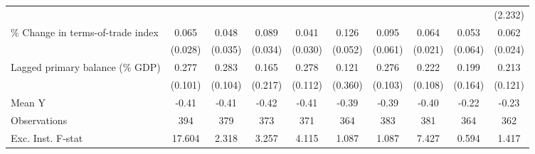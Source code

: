 {\begin{tabular}{l*{9}{c}}
                    &                     &                     &                     &                     &                     &                     &                     &                     &     (2.232)         \\
\addlinespace
\% Change in terms-of-trade index&       0.065\sym{**} &       0.048         &       0.089\sym{***}&       0.041         &       0.126\sym{**} &       0.095         &       0.064\sym{***}&       0.053         &       0.062\sym{***}\\
                    &     (0.028)         &     (0.035)         &     (0.034)         &     (0.030)         &     (0.052)         &     (0.061)         &     (0.021)         &     (0.064)         &     (0.024)         \\
\addlinespace
Lagged primary balance (\% GDP)&       0.277\sym{***}&       0.283\sym{***}&       0.165         &       0.278\sym{**} &       0.121         &       0.276\sym{***}&       0.222\sym{**} &       0.199         &       0.213\sym{*}  \\
                    &     (0.101)         &     (0.104)         &     (0.217)         &     (0.112)         &     (0.360)         &     (0.103)         &     (0.108)         &     (0.164)         &     (0.121)         \\
\midrule
Mean Y              &       -0.41         &       -0.41         &       -0.42         &       -0.41         &       -0.39         &       -0.39         &       -0.40         &       -0.22         &       -0.23         \\
Observations        &         394         &         379         &         373         &         371         &         364         &         383         &         381         &         364         &         362         \\
Exc. Inst. F-stat   &      17.604         &       2.318         &       3.257         &       4.115         &       1.087         &       1.087         &       7.427         &       0.594         &       1.417         \\
\bottomrule
\end{tabular}
}
